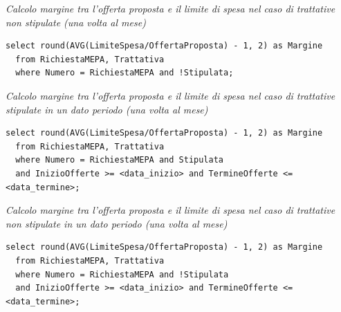 \noindent\textit{Calcolo margine tra l'offerta proposta e il limite di spesa nel caso di trattative non stipulate (una volta al mese)}
\begin{verbatim}
select round(AVG(LimiteSpesa/OffertaProposta) - 1, 2) as Margine
  from RichiestaMEPA, Trattativa
  where Numero = RichiestaMEPA and !Stipulata;
\end{verbatim}
\vspace{0.5cm}

\noindent{}
\newline\newline

\noindent\textit{Calcolo margine tra l'offerta proposta e il limite di spesa nel caso di trattative stipulate in un dato periodo (una volta al mese)}
\begin{verbatim}
select round(AVG(LimiteSpesa/OffertaProposta) - 1, 2) as Margine
  from RichiestaMEPA, Trattativa
  where Numero = RichiestaMEPA and Stipulata
  and InizioOfferte >= <data_inizio> and TermineOfferte <= <data_termine>;
\end{verbatim}
\vspace{0.5cm}

\noindent\textit{Calcolo margine tra l'offerta proposta e il limite di spesa nel caso di trattative non stipulate in un dato periodo (una volta al mese)}
\begin{verbatim}
select round(AVG(LimiteSpesa/OffertaProposta) - 1, 2) as Margine
  from RichiestaMEPA, Trattativa
  where Numero = RichiestaMEPA and !Stipulata
  and InizioOfferte >= <data_inizio> and TermineOfferte <= <data_termine>;
\end{verbatim}
\vspace{0.5cm}
